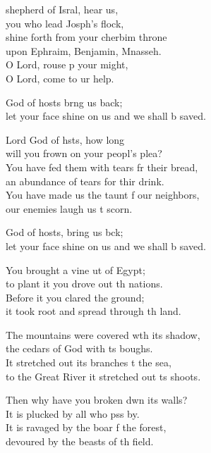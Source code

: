 \settowidth{\versewidth}{let your face shine on us and we shall be saved.}
\begin{psalmverse}%
  \begin{patverse}
 shepherd of Isral, hear us,\Med\\
you who lead Josph’s flock,\\
shine forth from your cherbim throne\Med\\
upon Ephraim, Benjamin, Mnasseh.\\
O Lord, rouse p your might,\Med\\
O Lord, come to ur help.

God of hosts br\pointup{\i}ng us back;\Med\\
let your face shine on us and we shall b saved.

Lord God of hsts, how long\Med\\
will you frown on your peopl’s plea?\\
You have fed them with tears fr their bread,\Med\\
an abundance of tears for thir drink.\\
You have made us the taunt f our neighbors,\Med\\
our enemies laugh us t scorn.

God of hosts, bring us bck;\Med\\
let your face shine on us and we shall b saved.

You brought a vine ut of Egypt;\Med\\
to plant it you drove out th nations.\\
Before it you clared the ground;\Med\\
it took root and spread through th land.

The mountains were covered w\pointup{\i}th its shadow,\Med\\
the cedars of God with \pointup{\i}ts boughs.\\
It stretched out its branches t the sea,\Med\\
to the Great River it stretched out \pointup{\i}ts shoots.

Then why have you broken dwn its walls?\Med\\
It is plucked by all who pss by.\\
It is ravaged by the boar f the forest,\Med\\
devoured by the beasts of th field.


\end{patverse}
\end{psalmverse}
